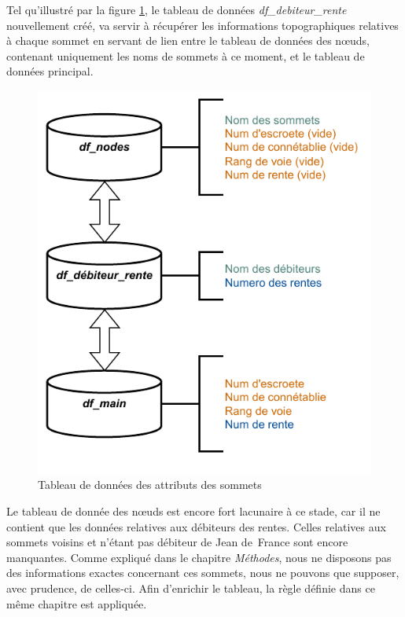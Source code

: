 Tel qu'illustré par la figure \ref{fig:from_main}, le tableau de données \textit{df\_debiteur\_rente} nouvellement créé, va servir à récupérer les informations topographiques relatives à chaque sommet en servant de lien entre le tableau de données des nœuds, contenant uniquement les noms de sommets à ce moment,  et le tableau de données principal.

\begin{figure}
    \centering
    \includegraphics[scale=0.75]{3.Results/Img/rel-from_main.drawio.pdf}
    \caption{Tableau de données des attributs des sommets}
    \label{fig:from_main}
\end{figure}

Le tableau de donnée des nœuds est encore fort lacunaire à ce stade, car il ne contient que les données relatives aux débiteurs des rentes. Celles relatives aux sommets voisins et n'étant pas débiteur de Jean de France sont encore manquantes. Comme expliqué dans le chapitre \textit{Méthodes}, nous ne disposons pas des informations exactes concernant ces sommets, nous ne pouvons que supposer, avec prudence, de celles-ci. Afin d'enrichir le tableau,  la règle définie dans ce même chapitre est appliquée.

